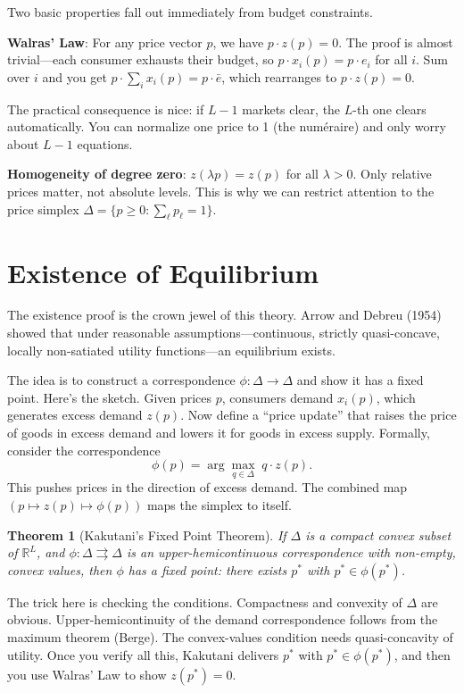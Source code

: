 \documentclass[11pt]{article}
\newtheorem{theorem}{Theorem}
\begin{document}
Two basic properties fall out immediately from budget constraints.

\textbf{Walras' Law}: For any price vector $p$, we have $p \cdot z(p) = 0$. The proof is almost trivial---each consumer exhausts their budget, so $p \cdot x_i(p) = p \cdot e_i$ for all $i$. Sum over $i$ and you get $p \cdot \sum_i x_i(p) = p \cdot \bar{e}$, which rearranges to $p \cdot z(p) = 0$.

The practical consequence is nice: if $L-1$ markets clear, the $L$-th one clears automatically. You can normalize one price to 1 (the num\'eraire) and only worry about $L-1$ equations.

\textbf{Homogeneity of degree zero}: $z(\lambda p) = z(p)$ for all $\lambda > 0$. Only relative prices matter, not absolute levels. This is why we can restrict attention to the price simplex $\Delta = \{p \geq 0 : \sum_\ell p_\ell = 1\}$.

\section{Existence of Equilibrium}

The existence proof is the crown jewel of this theory. Arrow and Debreu (1954) showed that under reasonable assumptions---continuous, strictly quasi-concave, locally non-satiated utility functions---an equilibrium exists.

The idea is to construct a correspondence $\phi : \Delta \to \Delta$ and show it has a fixed point. Here's the sketch. Given prices $p$, consumers demand $x_i(p)$, which generates excess demand $z(p)$. Now define a ``price update'' that raises the price of goods in excess demand and lowers it for goods in excess supply. Formally, consider the correspondence
\[
\phi(p) = \arg\max_{q \in \Delta} \; q \cdot z(p).
\]
This pushes prices in the direction of excess demand. The combined map $(p \mapsto z(p) \mapsto \phi(p))$ maps the simplex to itself.

\begin{theorem}[Kakutani's Fixed Point Theorem]
If $\Delta$ is a compact convex subset of $\mathbb{R}^L$, and $\phi : \Delta \rightrightarrows \Delta$ is an upper-hemicontinuous correspondence with non-empty, convex values, then $\phi$ has a fixed point: there exists $p^*$ with $p^* \in \phi(p^*)$.
\end{theorem}

The trick here is checking the conditions. Compactness and convexity of $\Delta$ are obvious. Upper-hemicontinuity of the demand correspondence follows from the maximum theorem (Berge). The convex-values condition needs quasi-concavity of utility. Once you verify all this, Kakutani delivers $p^*$ with $p^* \in \phi(p^*)$, and then you use Walras' Law to show $z(p^*) = 0$.
\end{document}
